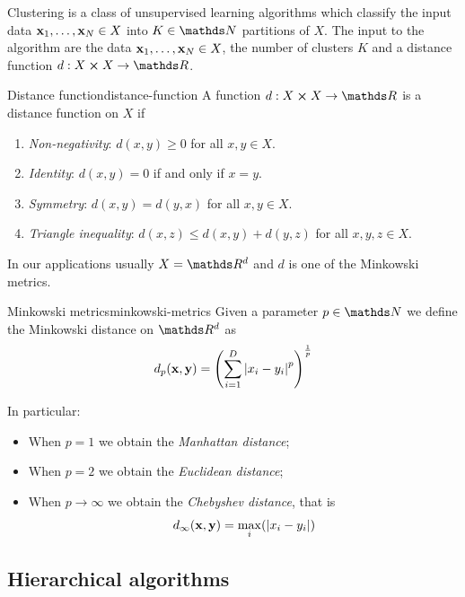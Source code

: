 \documentclass[12pt]{extarticle}
\renewcommand{\vec}[1]{\bvec{#1}}
\begin{document}
Clustering is a class of unsupervised learning algorithms which classify the input data
$\vec x_1, \dots, \vec x_N \in X$ into $K \in \N$ partitions of $X$.
The input to the algorithm are the data $\vec x_1, \dots, \vec x_N \in X$, the number of clusters
$K$ and a distance function $d: X \cross X \to \R$.


\begin{definition}{Distance function}{distance-function}
	A function $d: X \cross X \to \R$ is a distance function on $X$ if
	\begin{enumerate}[label=\roman*.]
		\item \emph{Non-negativity}: $d(x, y) \geq 0$ for all $x, y \in X$.
		\item \emph{Identity}: $d(x, y) = 0$ if and only if $x = y$.
		\item \emph{Symmetry}: $d(x, y) = d(y, x)$ for all $x, y \in X$.
		\item \emph{Triangle inequality}: $d(x, z) \leq d(x, y) + d(y, z)$ for all $x, y, z \in X$.
	\end{enumerate}
\end{definition}

In our applications usually $X = \R^d$ and $d$ is one of the Minkowski metrics.

\begin{definition}{Minkowski metrics}{minkowski-metrics}
	Given a parameter $p \in \N$ we define the Minkowski distance on $\R^d$ as
	\begin{equation}
		d_p(\vec x, \vec y) = \left( \sum_{i = 1}^D \abs{x_i - y_i}^p\right)^{\frac{1}{p}}
	\end{equation}

	In particular:
	\begin{itemize}
		\item When $p = 1$ we obtain the \emph{Manhattan distance};
		\item When $p = 2$ we obtain the \emph{Euclidean distance};
		\item When $p \to \infty$ we obtain the \emph{Chebyshev distance}, that is
		      \begin{equation}
			      d_\infty(\vec x, \vec y) = \max_i (\abs{x_i - y_i})
		      \end{equation}
	\end{itemize}
\end{definition}

\subsection{Hierarchical algorithms}
\end{document}
